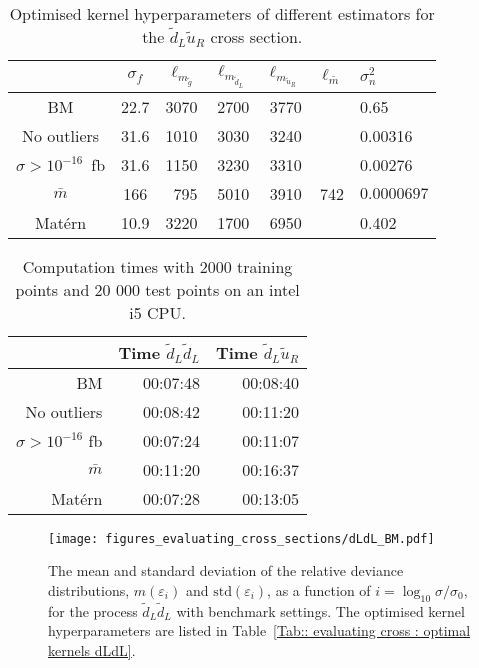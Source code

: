 \documentclass[twoside,english]{uiofysmaster}
\begin{document}
{{\begin{table}
\centering
\begin{tabular}{@{}ccrrrrl@{}} \toprule
 & $\sigma_f$ & $\ell_{m_{\widetilde{g}}}$ & $\ell_{m_{\widetilde{d}_L}}$ & $\ell_{m_{\widetilde{u}_R}}$ & $\ell_{\bar{m}}$ &$\sigma_n^2$\\ \midrule
BM & 22.7 & 3070 & 2700 & 3770 && 0.65 \\
No outliers &  31.6& 1010 & 3030 & 3240&& 0.00316\\ 
$\sigma > 10^{-16}$~fb & 31.6 &1150  & 3230& 3310&& 0.00276 \\
$\bar{m}$ & 166 & 795&5010 &3910 & 742 & $0.0000697$\\
Mat\'{e}rn & 10.9 & 3220  &1700 & 6950 && 0.402\\ \bottomrule
\end{tabular}
\caption{Optimised kernel hyperparameters of different estimators for the $\widetilde{d}_L \widetilde{u}_R$ cross section.}
\label{Tab:: evaluating cross : optimal kernels dLuR}
\end{table}
 
 
 
\begin{table}
\centering
\begin{tabular}{@{}rrr@{}} \toprule
& Time $\widetilde{d}_L \widetilde{d}_L$ & Time $\widetilde{d}_L \widetilde{u}_R$\\
\midrule
BM & 00:07:48 & 00:08:40\\
No outliers & 00:08:42 & 00:11:20\\
$\sigma > 10^{-16}$ fb & 00:07:24 & 00:11:07\\
$\bar{m}$ & 00:11:20 & 00:16:37\\
Mat\'{e}rn & 00:07:28 & 00:13:05\\ \bottomrule
\end{tabular}
\caption{Computation times with 2000 training points and 20 000 test points on an intel i5 CPU.}
\label{Tab:: evaluating cross : computation times BM}
\end{table}


\begin{figure}
\centering
\texttt{[image: figures\_evaluating\_cross\_sections/dLdL\_BM.pdf]}
\caption{The mean and standard deviation of the relative deviance distributions, $m(\varepsilon_i)$ and $\mathrm{std}(\varepsilon_i)$, as a function of $i = \log_{10} \sigma / \sigma_0$, for the process $\widetilde{d}_L \widetilde{d}_L$ with benchmark settings. The optimised kernel hyperparameters are listed in Table~\ref{Tab:: evaluating cross : optimal kernels dLdL}.}
\label{Fig:: evaluating cross : BM dLdL error plot}
\end{figure}

}}
\end{document}
